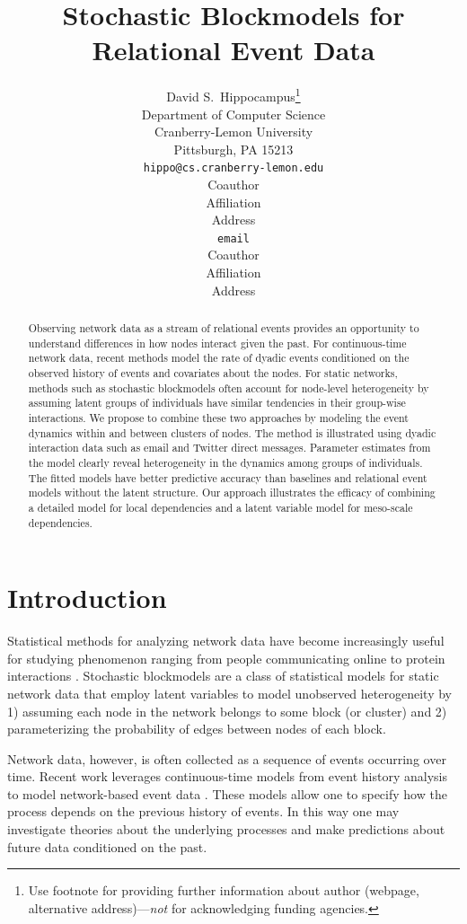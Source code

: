\documentclass{article}
\title{Stochastic Blockmodels for Relational Event Data}
\author{
David S.~Hippocampus\thanks{ Use footnote for providing further information
about author (webpage, alternative address)---\emph{not} for acknowledging
funding agencies.} \\
Department of Computer Science\\
Cranberry-Lemon University\\
Pittsburgh, PA 15213 \\
\texttt{hippo@cs.cranberry-lemon.edu} \\
\And
Coauthor \\
Affiliation \\
Address \\
\texttt{email} \\
\AND
Coauthor \\
Affiliation \\
Address \\
}
\begin{document}
 

\maketitle

\begin{abstract}
Observing network data as a stream of relational events provides an opportunity to understand differences in how nodes interact given the past.  For continuous-time network data, recent methods model the rate of dyadic events conditioned on the observed history of events and covariates about the nodes.  For static networks, methods such as stochastic blockmodels often account for node-level heterogeneity by assuming latent groups of individuals have similar tendencies in their group-wise interactions.  We propose to combine these two approaches by modeling the event dynamics within and between clusters of nodes.  The method is illustrated using dyadic interaction data such as email and Twitter direct messages.  Parameter estimates from the model clearly reveal heterogeneity in the dynamics among groups of individuals.  The fitted models have better predictive accuracy than baselines and relational event models without the latent structure.  Our approach illustrates the efficacy of combining a detailed model for local dependencies and a latent variable model for meso-scale dependencies.
\end{abstract}

\section{Introduction}

Statistical methods for analyzing network data have become increasingly useful for studying  phenomenon ranging from people communicating online to protein interactions \cite{Goldenberg2009}.  Stochastic blockmodels \cite{Nowicki2001, Kemp, Ishiguro2010} are a class of statistical models for static network data that employ latent variables to model unobserved heterogeneity by 1) assuming each node in the network belongs to some block (or cluster) and 2) parameterizing the probability of edges between nodes of each block.  %

Network data, however, is often collected as a sequence of events occurring over time.   Recent work leverages  continuous-time models from event history analysis  \cite{AalenOddO.2008} to model network-based event data \cite{Butts2008,Brandes2009,Perry2011,Stadtfeld2010,Stadtfeld2011,Opsahl2011,Vu2011,Vu2011a}.  These models allow one to specify how the process depends on the previous history of events.  In this way one may investigate theories about the underlying processes and make predictions about future data conditioned on the past.
\end{document}
